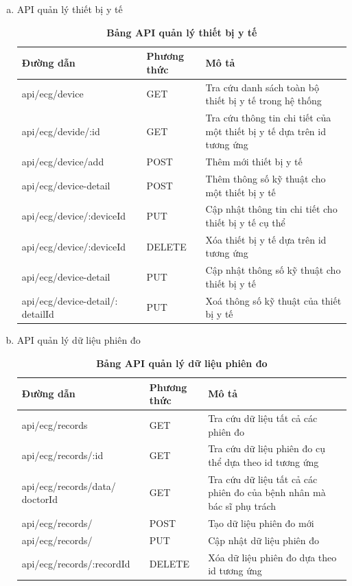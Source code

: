 \begin{enumerate}[a)]
\item API quản lý thiết bị y tế
\begin{xltabular}{\textwidth}{
  | >{\raggedright\arraybackslash}m{4.8cm}
  | >{\centering\arraybackslash}m{2.8cm}
  | >{\raggedright\arraybackslash}X |
  }
  \caption{\bfseries \fontsize{12pt}{0pt}\selectfont Bảng API quản lý thiết bị y tế}
  \label{table_api_device}
  \\
  \hline
  \bfseries Đường dẫn    &\bfseries Phương thức    &\bfseries Mô tả\\ \hline
  api/ecg/device   &   GET  & Tra cứu danh sách toàn bộ thiết bị y tế trong hệ thống\\ \hline
  api/ecg/devide/:id   &    GET    & Tra cứu thông tin chi tiết của một thiết bị y tế dựa trên id tương ứng \\ \hline
  api/ecg/device/add &   POST     & Thêm mới thiết bị y tế \\ \hline
  api/ecg/device-detail &   POST     & Thêm thông số kỹ thuật cho một thiết bị y tế \\ \hline
  api/ecg/device/:deviceId  &     PUT   & Cập nhật thông tin chi tiết cho thiết bị y tế cụ thể \\ \hline
  api/ecg/device/:deviceId  &     DELETE   & Xóa thiết bị y tế dựa trên id tương ứng \\ \hline
  api/ecg/device-detail  &     PUT   & Cập nhật thông số kỹ thuật cho thiết bị y tế \\ \hline
  api/ecg/device-detail/: detailId  &     PUT   & Xoá thông số kỹ thuật của thiết bị y tế \\ \hline
\end{xltabular}

\item API quản lý dữ liệu phiên đo
\begin{xltabular}{\textwidth}{
  | >{\raggedright\arraybackslash}p{5cm}
  | >{\centering\arraybackslash}m{2.8cm}
  | >{\raggedright\arraybackslash}X |
  }
  \caption{\bfseries \fontsize{12pt}{0pt}\selectfont Bảng API quản lý dữ liệu phiên đo}
  \label{table_api_record}
  \\
  \hline
  \bfseries Đường dẫn    &\bfseries Phương thức    &\bfseries Mô tả \\ \hline
   api/ecg/records   &   GET  & Tra cứu dữ liệu tất cả các phiên đo \\ \hline
   api/ecg/records/:id   &    GET    & Tra cứu dữ liệu phiên đo cụ thể dựa theo id tương ứng \\ \hline
   api/ecg/records/data/ doctorId &   GET     & Tra cứu dữ liệu tất cả các phiên đo của bệnh nhân mà bác sĩ phụ trách \\ \hline
   api/ecg/records/   &    POST    & Tạo dữ liệu phiên đo mới \\ \hline
   api/ecg/records/   &    PUT    & Cập nhật dữ liệu phiên đo \\ \hline
   api/ecg/records/:recordId  &    DELETE    & Xóa dữ liệu phiên đo dựa theo id tương ứng \\ \hline
  \end{xltabular}



\end{enumerate}
